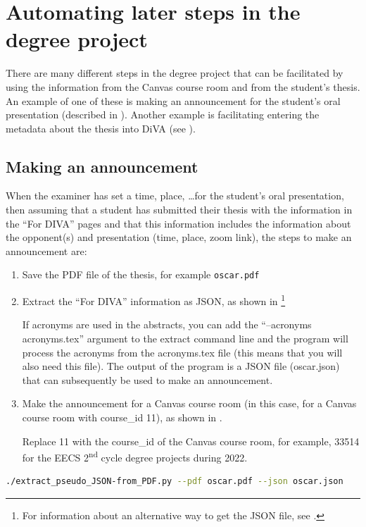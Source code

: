 \section{Automating later steps in the degree project}
\label{sec:AutomatingLaterSteps}
There are many different steps in the degree project that can be facilitated by using the information from the Canvas course room and from the student's thesis. An example of one of these is making an announcement for the student's oral presentation (described in ). Another example is facilitating entering the metadata about the thesis into DiVA (see ).

\subsection{Making an announcement}
\label{sec:makingAnAnnouncement}
When the examiner has set a time, place, \ldots for the student's oral presentation, then assuming that a student has submitted their thesis with the information in the “For DIVA” pages and that this information includes the information about the opponent(s) and presentation (\eg time, place, zoom link), the steps to make an announcement are:
\begin{enumerate}
    \item Save the PDF file of the thesis, for example \texttt{oscar.pdf}
    \item Extract the “For DIVA” information as JSON, as shown in \footnote{For information about an alternative way to get the JSON file, see .}
    
    If acronyms are used in the abstracts, you can add the “--acronyms acronyms.tex” argument to the extract command line and the program will process the acronyms from the acronyms.tex file (this means that you will also need this file). The output of the program is a JSON file (oscar.json) that can subsequently be used to make an announcement.
    
    \item Make the announcement for a Canvas course room (in this case, for a Canvas course room with course\_id 11), as shown in .
    
    Replace 11 with the course\_id of the Canvas course room, for example, 33514 for the EECS 2\textsuperscript{nd} cycle degree projects during 2022.
\end{enumerate}
\begin{lstlisting}[language={bash}, caption={extract\_pseudo\_JSON-from\_PDF.py for Oscar}, label=lst:extractPseudoJSONFromPDFforOscarFileToJSON]    
   ./extract_pseudo_JSON-from_PDF.py --pdf oscar.pdf --json oscar.json
\end{lstlisting}

